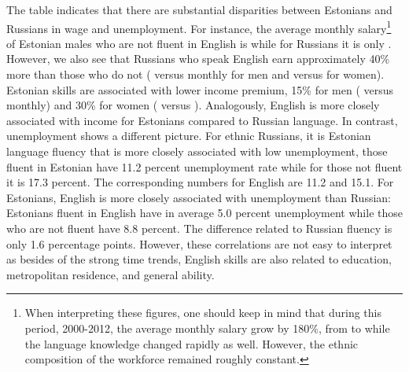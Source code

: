 \documentclass[12pt, a4paper]{article}
\begin{document}
The table indicates that there are substantial disparities between
Estonians and Russians in wage and unemployment. For instance, the
average monthly salary\footnote{When interpreting these figures,
  one should keep in mind that during this period, 2000-2012, the average monthly salary grow by 180\%,
  from  to  while the language knowledge changed rapidly as
  well.  However, the ethnic composition of the workforce remained
  roughly constant.} of Estonian
males who are not fluent in English is  while for Russians it
is only . However, we also see that Russians who speak
English earn approximately 40\% more than those who do not (
versus  monthly for men and  versus  for
women). Estonian skills are associated with lower income premium, 15\%
for men ( versus  monthly) and 30\% for women
( versus ).  Analogously, English is more closely
associated with income for Estonians compared to Russian language. In
contrast, unemployment shows a different picture. For ethnic Russians,
it is Estonian language fluency that is more closely associated with
low unemployment, those fluent in Estonian have 11.2 percent
unemployment rate while for those not fluent it is 17.3 percent.  The
corresponding numbers for English are 11.2 and 15.1.  For Estonians,
English is more closely associated with unemployment than Russian:
Estonians fluent in English have in average 5.0 percent unemployment
while those who are not fluent have 8.8 percent.  The difference
related to Russian fluency is only 1.6 percentage points.  However,
these correlations are not easy to interpret as besides of the strong
time trends, English skills are
also related to education, metropolitan residence, and general
ability.
\end{document}
